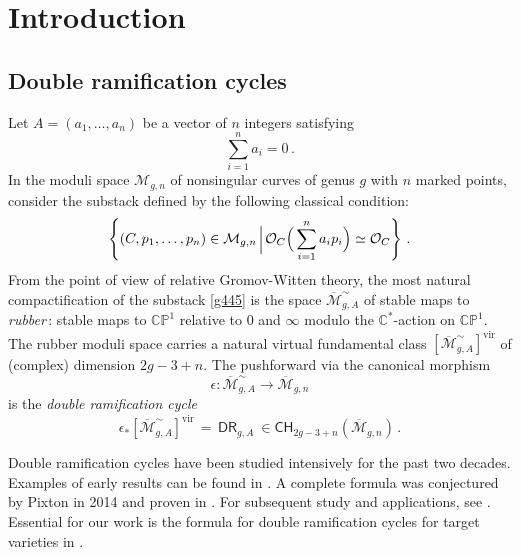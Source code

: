 \documentclass[a4paper,12pt]{article} %
\def\virt{\mathrm{vir}}
\def\CP{{{\mathbb {CP}}}}
\def\cO{\mathcal{O}}
\def\oM{\overline{\mathcal{M}}}
\def\cM{{\mathcal{M}}}
\def\C{{\mathcal{C}}}
\def\C{\mathbb{C}}
\theoremstyle{definition}
\theoremstyle{plain}%
\begin{document}
\section{Introduction}

\parskip=5pt


\subsection{Double ramification cycles}
\label{Ssec:DRclassic}

Let $A = (a_1, \dots, a_n)$ be a vector of $n$ integers satisfying
$$\sum_{i=1}^n a_i = 0\,. $$ In the moduli space $\cM_{g,n}$ of 
nonsingular curves of genus $g$ with $n$ marked points,
 consider the substack defined by the following classical condition: 
\begin{equation}\label{g445}
\left\{ (C, p_1, \dots, p_n) \in \cM_{g,n} \; \rule[-0.8em]{0.05em}{2em} \; 
\cO_C\Big(\sum_{i=1}^n a_i p_i\Big) \simeq \cO_C \right\}\, . 
\end{equation}
From the point of view of relative Gromov-Witten theory, 
the most natural compactification of the substack \eqref{g445} 
is the space $\oM^{\sim}_{g,A}$ of stable maps to
{\em rubber}\,: stable maps to
 $\CP^1$ relative to $0$ and $\infty$ modulo the $\C^*$-action on $\CP^1$.
The rubber moduli space carries a natural virtual fundamental class $\left[\oM^{\sim}_{g,A}\right]^\virt$ of (complex)
dimension $2g-3+n$. The pushforward 
via the canonical morphism
$$ \epsilon:\oM^{\sim}_{g,A} \rightarrow  \oM_{g,n}$$
is the {\em double ramification cycle} 
$$\epsilon_*\left[\oM^{\sim}_{g,A}\right]^\virt\, =\, \mathsf{DR}_{g,A}\ \in 
{\mathsf{CH}}_{2g-3+n}(\overline{\cM}_{g,n})\,. $$


Double ramification cycles have been studied intensively for the 
past two decades.
Examples of early results can be found in \cite{BSSZ,Cavalieri2011Polynomial-fami,cj,Faber2005Relative-maps-a,Grushevsky2012The-double-rami,Hain2013Normal-function, Marcus2013Stable-maps-to-}.
A complete formula was conjectured by
Pixton in 2014 and proven in \cite{Janda2016Double-ramifica}. 
For subsequent 
study and applications, see \cite{Bae,BGR,CGJZ,FanWu,Farkas2016The-moduli-spac,Holmes2017Extending-the-d,
Holmes2017Jacobian-extens,
Holmes2017Multiplicativit,MPS20,ObPix,Pix18,Schmitt2016Dimension-theor,
Tseng2,Tseng1}. Essential for our work is the formula for double ramification
cycles for target varieties in \cite{Janda2018Double-ramifica}.
\end{document}
